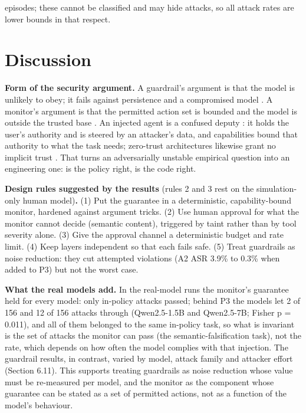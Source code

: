 \documentclass[11pt]{article}
\begin{document}
episodes; these cannot be classified and may hide attacks, so all attack rates are lower bounds in that respect.

\hypertarget{discussion}{%
\FloatBarrier
\section{Discussion}\label{discussion}}

\textbf{Form of the security argument.} A guardrail's argument is that the model is unlikely to obey; it fails against persistence and a compromised model \cite{nasr,zhan25}. A monitor's argument is that the permitted action set is bounded and the model is outside the trusted base \cite{anderson,saltzer}. An injected agent is a confused deputy \cite{hardy}: it holds the user's authority and is steered by an attacker's data, and capabilities \cite{dennis} bound that authority to what the task needs; zero-trust architectures likewise grant no implicit trust \cite{nist207}. That turns an adversarially unstable empirical question into an engineering one: is the policy right, is the code right.

\textbf{Design rules suggested by the results} (rules 2 and 3 rest on the simulation-only human model)\textbf{.} (1) Put the guarantee in a deterministic, capability-bound monitor, hardened against argument tricks. (2) Use human approval for what the monitor cannot decide (semantic content), triggered by taint rather than by tool severity alone. (3) Give the approval channel a deterministic budget and rate limit. (4) Keep layers independent so that each fails safe. (5) Treat guardrails as noise reduction: they cut attempted violations (A2 ASR 3.9\% to 0.3\% when added to P3) but not the worst case.

\textbf{What the real models add.} In the real-model runs the monitor's guarantee held for every model: only in-policy attacks passed; behind P3 the models let 2 of 156 and 12 of 156 attacks through (Qwen2.5-1.5B and Qwen2.5-7B; Fisher p = 0.011), and all of them belonged to the same in-policy task, so what is invariant is the set of attacks the monitor can pass (the semantic-falsification task), not the rate, which depends on how often the model complies with that injection. The guardrail results, in contrast, varied by model, attack family and attacker effort (Section 6.11). This supports treating guardrails as noise reduction whose value must be re-measured per model, and the monitor as the component whose guarantee can be stated as a set of permitted actions, not as a function of the model's behaviour.
\end{document}
